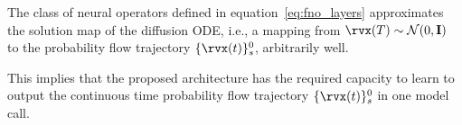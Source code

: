 \begin{proposition} 
The class of neural operators defined in equation~\ref{eq:fno_layers} approximates the solution map of the diffusion ODE, i.e., a mapping from $\rvx(T)\sim \mathcal{N}(0,\mathbf{I})$ to the probability flow trajectory $\{\rvx(t)\}_{s}^{0}$, arbitrarily well. 
\end{proposition}
This implies that the proposed architecture has the required capacity to learn to output the continuous time probability flow trajectory $\{\rvx(t)\}_{s}^{0}$ in one model call. 









\vspace{-0.1in}
